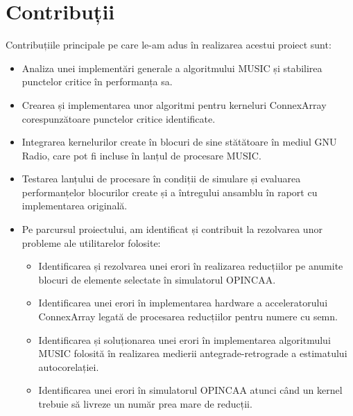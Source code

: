 \chapter*{Contribuții}

Contribuțiile principale pe care le-am adus în realizarea acestui proiect sunt:
\begin{itemize}
  \item Analiza unei implementări generale a algoritmului MUSIC și stabilirea
  punctelor critice în performanța sa.

  \item Crearea și implementarea unor algoritmi pentru kerneluri ConnexArray
  corespunzătoare punctelor critice identificate.

  \item Integrarea kernelurilor create în blocuri de sine stătătoare în mediul
  GNU Radio, care pot fi incluse în lanțul de procesare MUSIC.

  \item Testarea lanțului de procesare în condiții de simulare și evaluarea
  performanțelor blocurilor create și a întregului ansamblu în raport cu
  implementarea originală.

  \item Pe parcursul proiectului, am identificat și contribuit la rezolvarea
  unor probleme ale utilitarelor folosite:
  \begin{itemize}
    \item Identificarea și rezolvarea unei erori în realizarea reducțiilor pe
    anumite blocuri de elemente selectate în simulatorul OPINCAA.

    \item Identificarea unei erori în implementarea hardware a acceleratorului
    ConnexArray legată de procesarea reducțiilor pentru numere cu semn.

    \item Identificarea și soluționarea unei erori în implementarea algoritmului
    MUSIC folosită în realizarea medierii antegrade-retrograde a estimatului
    autocorelației.

    \item Identificarea unei erori în simulatorul OPINCAA atunci când un kernel
    trebuie să livreze un număr prea mare de reducții.
  \end{itemize}
\end{itemize}


